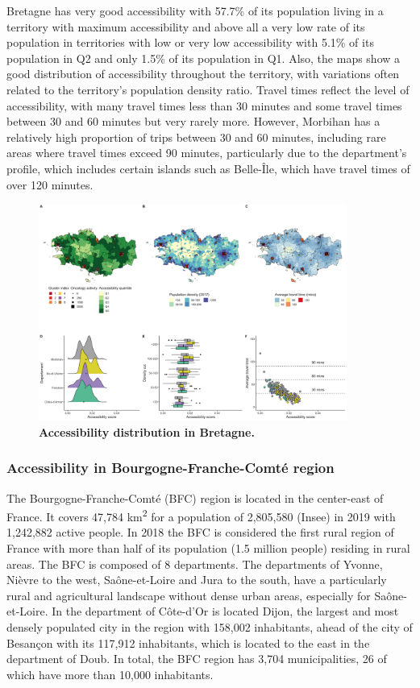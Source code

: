 Bretagne has very good accessibility with 57.7\% of its population living in a
territory with maximum accessibility and above all a very low rate of its
population in territories with low or very low accessibility with 5.1\% of its
population in Q2 and only 1.5\% of its population in Q1. Also, the maps show a
good distribution of accessibility throughout the territory, with variations
often related to the territory's population density ratio. Travel times reflect
the level of accessibility, with many travel times less than 30 minutes and some
travel times between 30 and 60 minutes but very rarely more. However, Morbihan
has a relatively high proportion of trips between 30 and 60 minutes, including
rare areas where travel times exceed 90 minutes, particularly due to the
department's profile, which includes certain islands such as Belle-Île, which
have travel times of over 120 minutes.


\begin{figure}[h!]
    \includegraphics[width=0.9\textwidth]{images/camion/region_accessibility/accessibility_Bretagne.png}
    \centering
    \caption{
        \textbf{Accessibility distribution in Bretagne.}
    }
\end{figure}

\subsubsection{Accessibility in Bourgogne-Franche-Comté region}

The Bourgogne-Franche-Comté (BFC) region is located in the center-east of
France. It covers 47,784 km\textsuperscript{2} for a population of 2,805,580
(Insee) in 2019 with 1,242,882 active people. In 2018 the BFC is considered the
first rural region of France with more than half of its population (1.5 million
people) residing in rural areas. The BFC is composed of 8 departments. The
departments of Yvonne, Nièvre to the west, Saône-et-Loire and Jura to the south,
have a particularly rural and agricultural landscape without dense urban areas,
especially for Saône-et-Loire.  In the department of Côte-d'Or is located Dijon,
the largest and most densely populated city in the region with 158,002
inhabitants, ahead of the city of Besançon with its 117,912 inhabitants, which
is located to the east in the department of Doub. In total, the BFC region has
3,704 municipalities, 26 of which have more than 10,000 inhabitants.

